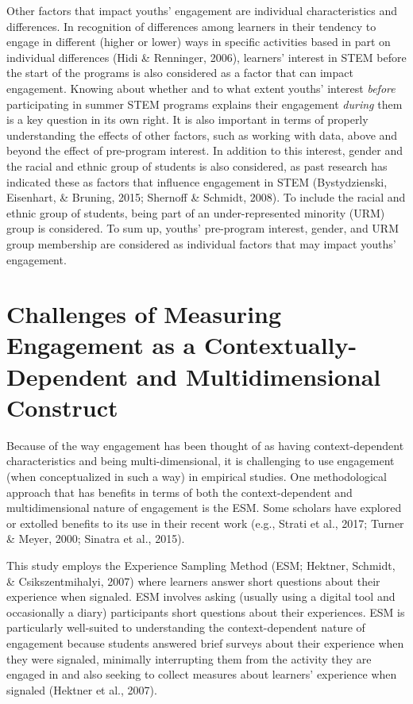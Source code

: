 \documentclass[]{book}
\theoremstyle{definition}
\theoremstyle{definition}
\theoremstyle{definition}
\theoremstyle{remark}
\begin{document}
Other factors that impact youths' engagement are individual
characteristics and differences. In recognition of differences among
learners in their tendency to engage in different (higher or lower) ways
in specific activities based in part on individual differences (Hidi \&
Renninger, 2006), learners' interest in STEM before the start of the
programs is also considered as a factor that can impact engagement.
Knowing about whether and to what extent youths' interest \emph{before}
participating in summer STEM programs explains their engagement
\emph{during} them is a key question in its own right. It is also
important in terms of properly understanding the effects of other
factors, such as working with data, above and beyond the effect of
pre-program interest. In addition to this interest, gender and the
racial and ethnic group of students is also considered, as past research
has indicated these as factors that influence engagement in STEM
(Bystydzienski, Eisenhart, \& Bruning, 2015; Shernoff \& Schmidt, 2008).
To include the racial and ethnic group of students, being part of an
under-represented minority (URM) group is considered. To sum up, youths'
pre-program interest, gender, and URM group membership are considered as
individual factors that may impact youths' engagement.

\section{Challenges of Measuring Engagement as a Contextually-Dependent
and Multidimensional
Construct}\label{challenges-of-measuring-engagement-as-a-contextually-dependent-and-multidimensional-construct}

Because of the way engagement has been thought of as having
context-dependent characteristics and being multi-dimensional, it is
challenging to use engagement (when conceptualized in such a way) in
empirical studies. One methodological approach that has benefits in
terms of both the context-dependent and multidimensional nature of
engagement is the ESM. Some scholars have explored or extolled benefits
to its use in their recent work (e.g., Strati et al., 2017; Turner \&
Meyer, 2000; Sinatra et al., 2015).

This study employs the Experience Sampling Method (ESM; Hektner,
Schmidt, \& Csikszentmihalyi, 2007) where learners answer short
questions about their experience when signaled. ESM involves asking
(usually using a digital tool and occasionally a diary) participants
short questions about their experiences. ESM is particularly well-suited
to understanding the context-dependent nature of engagement because
students answered brief surveys about their experience when they were
signaled, minimally interrupting them from the activity they are engaged
in and also seeking to collect measures about learners' experience when
signaled (Hektner et al., 2007).
\end{document}
